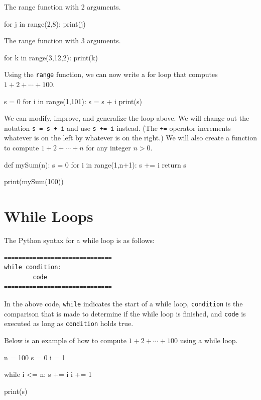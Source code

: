 \documentclass{ximera}
\begin{document}
The range function with 2 arguments.
\begin{sageCell}
for j in range(2,8):
     print(j)
\end{sageCell}

The range function with 3 arguments.
\begin{sageCell}
for k in range(3,12,2):
     print(k)
\end{sageCell}

Using the \verb|range| function, we can now write a for loop that computes $1+2+\cdots+100$.

\begin{sageCell}
s = 0 
for i in range(1,101):
        s = s + i
print(s)
\end{sageCell}

We can modify, improve, and generalize the loop above. We will change out the notation \verb|s = s + i| and use \verb|s += i| instead. (The \verb|+=| operator increments whatever is on the left by whatever is on the right.) We will also create a function to compute $1+2+\cdots+n$ for any integer $n>0$.

\begin{sageCell}
def mySum(n):
        s = 0
        for i in range(1,n+1):
                s += i
        return s

print(mySum(100))
\end{sageCell}

\section{While Loops}

The Python syntax for a while loop is as follows:

\begin{verbatim}
==============================
while condition:
        code
==============================
\end{verbatim}

In the above code, \verb|while| indicates the start of a while loop, \verb|condition| is the comparison that is made to determine if the while loop is finished, and \verb|code| is executed as long as \verb|condition| holds true.

Below is an example of how to compute $1+2+\cdots+100$ using a while loop.

\begin{sageCell}
n = 100
s = 0
i = 1

while i <= n:
        s += i
	i += 1

print(s)
\end{sageCell}
\end{document}
